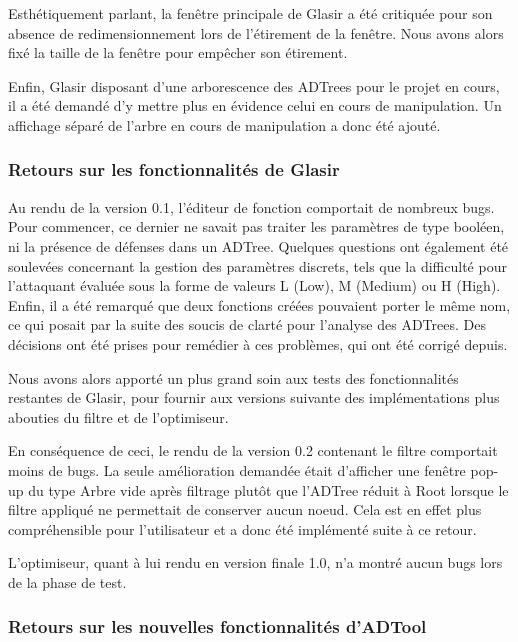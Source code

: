 Esthétiquement parlant, la fenêtre principale de Glasir a été critiquée pour son absence de redimensionnement lors de l'étirement de la fenêtre. Nous avons alors fixé la taille de la fenêtre pour empêcher son étirement. 

Enfin, Glasir disposant d'une arborescence des ADTrees pour le projet en cours, il a été demandé d'y mettre plus en évidence celui en cours de manipulation. Un affichage séparé de l'arbre en cours de manipulation a donc été ajouté.

\subsubsection{Retours sur les fonctionnalités de Glasir}
\label{subsubsec:Glasir}

Au rendu de la version 0.1, l'éditeur de fonction comportait de nombreux bugs. Pour commencer, ce dernier ne savait pas traiter les paramètres de type booléen, ni la présence de défenses dans un ADTree. Quelques questions ont également été soulevées concernant la gestion des paramètres discrets, tels que la difficulté pour l'attaquant évaluée sous la forme de valeurs L (Low), M (Medium) ou H (High). Enfin, il a été remarqué que deux fonctions créées pouvaient porter le même nom, ce qui posait par la suite des soucis de clarté pour l'analyse des ADTrees. Des décisions ont été prises pour remédier à ces problèmes, qui ont été corrigé depuis. 

Nous avons alors apporté un plus grand soin aux tests des fonctionnalités restantes de Glasir, pour fournir aux versions suivante des implémentations plus abouties du filtre et de l'optimiseur. 

En conséquence de ceci, le rendu de la version 0.2 contenant le filtre comportait moins de bugs. La seule amélioration demandée était d'afficher une fenêtre pop-up du type \og Arbre vide après filtrage \fg{} plutôt que l'ADTree réduit à \og Root \fg{} lorsque le filtre appliqué ne permettait de conserver aucun noeud. Cela est en effet plus compréhensible pour l'utilisateur et a donc été implémenté suite à ce retour.

L'optimiseur, quant à lui rendu en version finale 1.0, n'a montré aucun bugs lors de la phase de test.

\subsubsection{Retours sur les nouvelles fonctionnalités d'ADTool}
\label{subsubsec:ADTool}

